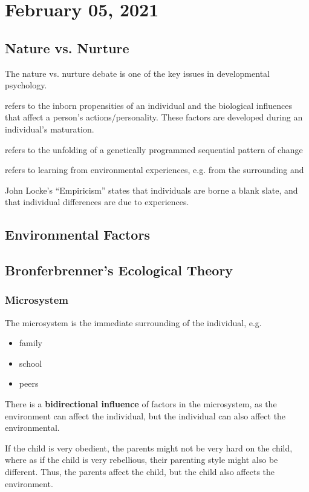 \documentclass[../main/main.tex]{subfiles}
\begin{document}
\section{February 05, 2021}
\subsection{Nature vs. Nurture}
The nature vs. nurture debate is one of the key issues in developmental psychology.
\begin{definition}
 refers to the inborn propensities of an individual and the biological influences that affect a person's actions/personality. These factors are developed during an individual's maturation.
\end{definition}
\begin{definition}
 refers to the unfolding of a genetically programmed sequential pattern of change
\end{definition}
\begin{definition}
 refers to learning from environmental experiences, e.g. from the surrounding and
\end{definition}
\begin{example}
John Locke’s “Empiricism” states that individuals are borne a blank slate, and that individual differences are due to experiences.
\end{example}
\subsection{Environmental Factors}
\subsection{Bronferbrenner's Ecological Theory}
\subsubsection{Microsystem}
The microsystem is the immediate surrounding of the individual, e.g.
\begin{itemize}
\item family
\item school
\item peers
\end{itemize}
There is a \textbf{bidirectional influence} of factors in the microsystem, as the environment can affect the individual, but the individual can also affect the environmental.
\begin{example}
If the child is very obedient, the parents might not be very hard on the child, where as if the child is very rebellious, their parenting style might also be different. Thus, the parents affect the child, but the child also affects the environment.
\end{example}
\end{document}
